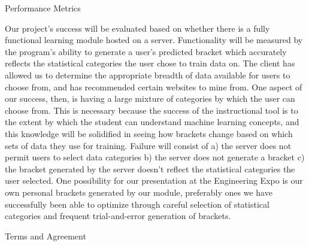 \documentclass[letterpaper,20pt,titlepage]{article}
\begin{document}
\begin{section}{Performance Metrics}


Our project’s success will be evaluated based on whether there is a fully functional learning module hosted on a server. Functionality will be measured by the program’s ability to generate a user’s predicted bracket which accurately reflects the statistical categories the user chose to train data on. The client has allowed us to determine the appropriate breadth of data available for users to choose from, and has recommended certain websites to mine from. One aspect of our success, then, is having a large mixture of categories by which the user can choose from. This is necessary because the success of the instructional tool is to the extent by which the student can understand machine learning concepts, and this knowledge will be solidified in seeing how brackets change based on which sets of data they use for training. Failure will consist of a) the server does not permit users to select data categories b) the server does not generate a bracket c) the bracket generated by the server doesn’t reflect the statistical categories the user selected. One possibility for our presentation at the Engineering Expo is our own personal brackets generated by our module, preferably ones we have successfully been able to optimize through careful selection of statistical categories and frequent trial-and-error generation of brackets.
\bigbreak
\bigbreak
\bigbreak
\end{section}

\newpage
\begin{section}{Terms and Agreement}
\bigbreak
\bigbreak
\bigbreak

\end{section}
\end{document}
